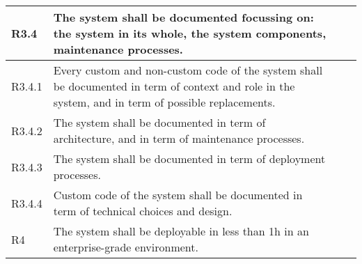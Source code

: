 \begin{landscape}
\begin{longtable}{|p{1cm}|p{19cm}|p{2cm}|p{3cm}|}
        \rowcolor[HTML]{FFDDDD}        R3.4       & The system shall be documented focussing on: the system in its whole, the system components, maintenance processes.                                                                                                                                                                   &                       &                                          \\ \hline
        \rowcolor[HTML]{FFEEEE}        R3.4.1     & Every custom and non-custom code of the system shall be documented in term of context and role in the system, and in term of possible replacements.                                                                                                                                   &                       &                                          \\\hline
        \rowcolor[HTML]{FFEEEE}        R3.4.2     & The system shall be documented in term of architecture, and in term of maintenance processes.                                                                                                                                                                                         &                       &                                          \\\hline
        \rowcolor[HTML]{FFEEEE}        R3.4.3     & The system shall be documented in term of deployment processes.                                                                                                                                                                                                                       &                       &                                          \\\hline
        \rowcolor[HTML]{FFEEEE}        R3.4.4     & Custom code of the system shall be documented in term of technical choices and design.                                                                                                                                                                                                &                       &                                          \\\hline
        \rowcolor[HTML]{C0C0C0}        R4         & The system shall be deployable in less than 1h in an enterprise-grade environment.                                                                                                                                                                                                    &                       &                                          \\ \hline

\end{longtable}
\end{landscape}
